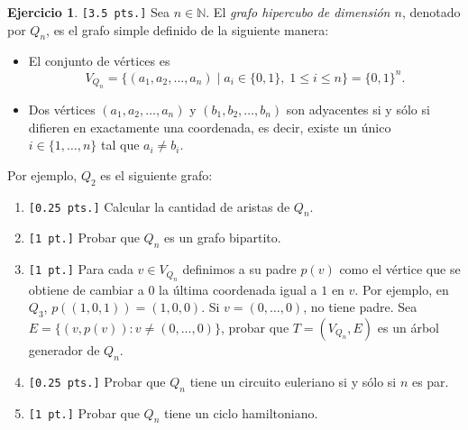 \documentclass[a4paper,oneside,12pt]{amsart}
\theoremstyle{definition}
\newtheorem{quest}{Ejercicio}
\begin{document}
\begin{quest}\verb|[3.5 pts.]|
Sea $n \in \mathbb{N}$. El \emph{grafo hipercubo de dimensión $n$}, denotado por $Q_n$, es el grafo simple definido
de la siguiente manera:
\begin{itemize}
    \item El conjunto de vértices es
    \[V_{Q_n} = \{ (a_1, a_2, \ldots, a_n) \mid a_i \in \{0,1\}, \; 1 \le i \le n \} = \{0,1\}^n.\]
    \item Dos vértices $(a_1, a_2, \ldots, a_n)$ y $(b_1, b_2, \ldots, b_n)$ son adyacentes si y sólo si difieren en
    exactamente una coordenada, es decir, existe un único $i \in \{1, \ldots, n\}$ tal que $a_i \ne b_i$.
\end{itemize}
Por ejemplo, $Q_2$ es el siguiente grafo:

\begin{center}
\end{center}

\begin{enumerate}[label=\alph*)]
    \item \verb|[0.25 pts.]| Calcular la cantidad de aristas de $Q_n$.
    \item \verb|[1 pt.]| Probar que $Q_n$ es un grafo bipartito.
    \item \verb|[1 pt.]| Para cada $v\in V_{Q_n}$ definimos a su padre $p(v)$ como el vértice que se obtiene de
    cambiar a $0$ la
    última coordenada igual a $1$ en $v$. Por ejemplo, en $Q_3$, $p((1,0,1))=(1,0,0)$. Si $v=(0,\dots,0)$, no tiene
    padre. Sea $E=\{(v, p(v))\colon v\neq (0,\dots,0)\}$, probar que $T=(V_{Q_n}, E)$ es un árbol generador de $Q_n$.
    \item \verb|[0.25 pts.]| Probar que $Q_n$ tiene un circuito euleriano si y sólo si $n$ es par.
    \item \verb|[1 pt.]| Probar que $Q_n$ tiene un ciclo hamiltoniano.

\end{enumerate}
\end{quest}
\end{document}

